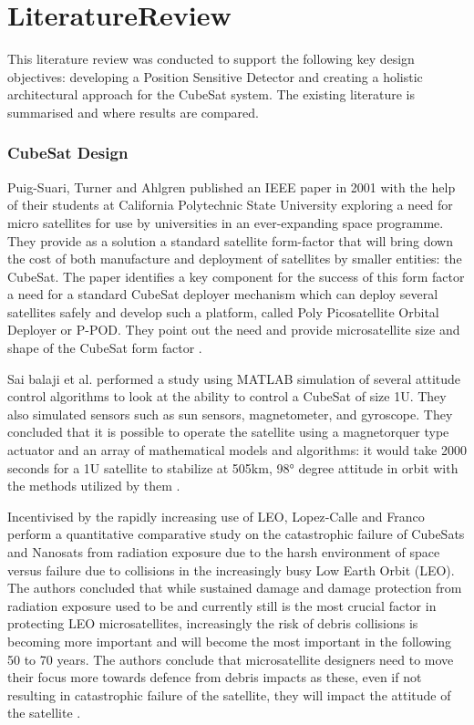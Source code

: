 \chapter{LiteratureReview}


This literature review was conducted to support the following key design objectives: developing a Position Sensitive Detector and creating a holistic architectural approach for the CubeSat system. The existing literature is summarised and where results are compared.

\subsection{CubeSat Design}
Puig-Suari, Turner and Ahlgren published an IEEE paper in 2001 with the help of their students at California Polytechnic State University exploring a need for micro satellites for use by universities in an ever-expanding space programme. They provide as a solution a standard satellite form-factor that will bring down the cost of both manufacture and deployment of satellites by smaller entities: the CubeSat. The paper identifies a key component for the success of this form factor a need for a standard CubeSat deployer mechanism which can deploy several satellites safely and develop such a platform, called Poly Picosatellite Orbital Deployer or P-POD. They point out the need and provide microsatellite size and shape of the CubeSat form factor \cite{Puig-Suari2001}.

Sai balaji et al. performed a study using MATLAB simulation of several attitude control algorithms to look at the ability to control a CubeSat of size 1U. They also simulated sensors such as sun sensors, magnetometer, and gyroscope. They concluded that it is possible to operate the satellite using a magnetorquer type actuator and an array of mathematical models and algorithms: it would take 2000 seconds for a 1U satellite to stabilize at 505km, 98° degree attitude in orbit with the methods utilized by them \cite{Balaji2023}.

Incentivised by the rapidly increasing use of LEO, Lopez‑Calle and Franco perform a quantitative comparative study on the catastrophic failure of CubeSats and Nanosats from radiation exposure due to the harsh environment of space versus failure due to collisions in the increasingly busy Low Earth Orbit (LEO). The authors concluded that while sustained damage and damage protection from radiation exposure used to be and currently still is the most crucial factor in protecting LEO microsatellites, increasingly the risk of debris collisions is becoming more important and will become the most important in the following 50 to 70 years. The authors conclude that microsatellite designers need to move their focus more towards defence from debris impacts as these, even if not resulting in catastrophic failure of the satellite, they will impact the attitude of the satellite \cite{Lopez-Calle2023}.


